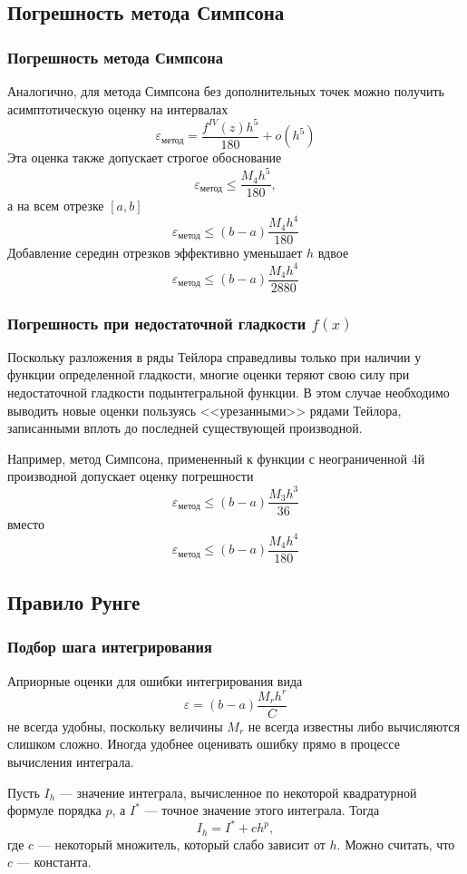 \documentclass[apectratio=43,unicode]{beamer}
\begin{document}
\subsection{Погрешность метода Симпсона}
\begin{frame}
\frametitle{Погрешность метода Симпсона}
	Аналогично, для метода Симпсона без дополнительных точек можно получить
	асимптотическую оценку на интервалах
	\[
	\varepsilon_{\text{метод}} = \frac{f^{IV}(z) h^5}{180} + o(h^5)
	\]
	Эта оценка также допускает строгое обоснование
	\[
	\varepsilon_{\text{метод}} \leq \frac{M_4 h^5}{180},
	\]
	а на всем отрезке $[a,b]$
	\[
	\varepsilon_{\text{метод}} \leq (b-a)\frac{M_4 h^4}{180}
	\]
	Добавление середин отрезков эффективно уменьшает $h$ вдвое
	\[
	\varepsilon_{\text{метод}} \leq (b-a)\frac{M_4 h^4}{2880}
	\]
\end{frame}

\begin{frame}
\frametitle{Погрешность при недостаточной гладкости $f(x)$}
	Поскольку разложения в ряды Тейлора справедливы только
	при наличии у функции определенной гладкости,
	многие оценки теряют свою силу при недостаточной гладкости
	подынтегральной функции. В этом случае необходимо выводить новые оценки пользуясь
	<<урезанными>> рядами Тейлора, записанными вплоть до последней существующей производной.

	Например, метод Симпсона, примененный к функции с неограниченной 4й производной допускает оценку погрешности
	\[
	\varepsilon_{\text{метод}} \leq (b-a)\frac{M_3 h^3}{36}
	\]
	вместо
	\[
	\varepsilon_{\text{метод}} \leq (b-a)\frac{M_4 h^4}{180}
	\]
\end{frame}

\subsection{Правило Рунге}
\begin{frame}
\frametitle{Подбор шага интегрирования}
	Априорные оценки для ошибки интегрирования вида
	\[
		\varepsilon = (b-a)\frac{M_r h^r}{C}
	\]
	не всегда удобны, поскольку величины $M_r$ не всегда известны либо вычисляются
	слишком сложно. Иногда удобнее оценивать ошибку прямо в процессе вычисления интеграла.

	Пусть $I_h$ --- значение интеграла, вычисленное по некоторой квадратурной
	формуле порядка $p$, а $I^*$ --- точное значение этого интеграла. Тогда
	\[
		I_h = I^* + c h^p,
	\]
	где $c$ --- некоторый множитель, который слабо зависит от $h$. Можно считать,
	что $c$ --- константа.
\end{frame}
\end{document}

